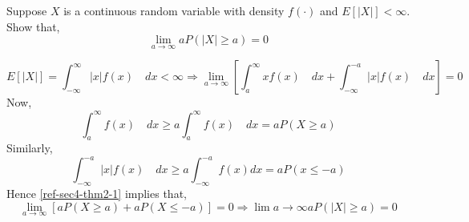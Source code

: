 \begin{example}
Suppose $X$ is a continuous random variable with density $f(\cdot)$ and
$E[\vert X \vert] < \infty$. Show that, 
\[
    \lim_{a \rightarrow \infty} a P(\vert X \vert \geq a) = 0
\]
\end{example}
\begin{solution}
\begin{equation} \label{ref-sec4-thm2-1}
    E[\vert X \vert] = \int_{-\infty}^{\infty} \vert x \vert f(x) \quad dx
                     < \infty
    \Rightarrow
    \lim_{a \rightarrow \infty} \left[
        \int_{a}^{\infty} x f(x) \quad dx +
        \int_{-\infty}^{-a} \vert x \vert f(x) \quad dx
    \right] = 0
\end{equation}
Now,
\[
    \int_{a}^{\infty} f(x) \quad dx \geq a \int_{a}^{\infty} f(x) \quad dx
                                    =    a P(X \geq a)
\]
Similarly,
\[
         \int_{-\infty}^{-a} \vert x \vert f(x) \quad dx 
    \geq a \int_{-\infty}^{-a} f(x) dx
    =    a P(x \leq -a)
\]
Hence \ref{ref-sec4-thm2-1} implies that,
\[
    \lim_{a \rightarrow \infty} [
        a P(X \geq a) +
        a P(X \leq -a)
    ] = 0
    \Rightarrow
    \lim{a \rightarrow \infty} a P(\vert X \vert \geq a) = 0
\]
\end{solution}

